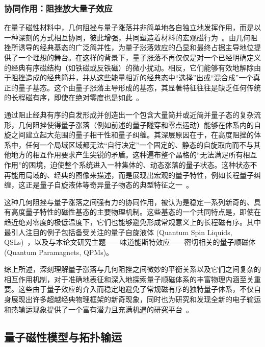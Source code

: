 \subsubsection{协同作用：阻挫放大量子效应}

在量子磁性材料中，几何阻挫与量子涨落并非简单地各自独立地发挥作用，而是以一种深刻的方式相互协同，彼此增强，共同塑造着材料的宏观磁行为~\cite{tu2022Evidence,bandyopadhyay2024Quantum}。由几何阻挫所诱导的经典基态的广泛简并性，为量子涨落效应的凸显和最终占据主导地位提供了一个理想的舞台。在这样的背景下，量子涨落不再仅仅是对一个已经明确定义的经典有序磁结构（如铁磁或反铁磁）的微小扰动。相反，它们能够有效地解除由于阻挫造成的经典简并，并从这些能量相近的经典态中“选择”出或“混合成”一个真正的量子基态。这个由量子涨落主导形成的基态，其显著特征往往是缺乏任何传统的长程磁有序，即使在绝对零度也是如此~\cite{chen2017Quantum}。

通过阻止经典有序的自发形成并创造出一个包含大量简并或近简并量子态的复杂流形，几何阻挫使得量子涨落（例如前述的量子隧穿和零点运动）能够在体系内的自旋之间建立起大范围的量子相干性和量子纠缠。其深层原因在于，在高度阻挫的体系中，任何一个局域区域都无法“自行决定”一个固定的、静态的自旋取向而不与其他地方的相互作用要求产生尖锐的矛盾。这种遍布整个晶格的“无法满足所有相互作用”的困境，迫使整个系统进入一种集体的、动态涨落的量子状态。这种状态不再能用局域的、经典的图像来描述，而是展现出宏观的量子特性，例如长程量子纠缠，这正是量子自旋液体等奇异量子物态的典型特征之一~\cite{matsuda2025Kitaev}。

这种几何阻挫与量子涨落之间强有力的协同作用，被认为是稳定一系列新奇的、具有高度量子特性的磁性基态的主要物理机制。这些基态的一个共同特点是，即使在趋近绝对零度的极低温度下，它们也能够避免形成常规意义上的长程磁有序。其中最引人注目的例子包括备受关注的量子自旋液体 (Quantum Spin Liquids, QSLs)~\cite{tu2022Evidence,chen2017Quantum}，以及与本论文研究主题——味道能斯特效应——密切相关的量子顺磁体 (Quantum Paramagnets, QPMs)。

综上所述，深刻理解量子涨落与几何阻挫之间微妙的平衡关系以及它们之间复杂的相互作用机制，对于准确地表征和深入地探索量子顺磁体系的丰富物理内涵至关重要。这些由于量子效应的介入而稳定地避免了常规磁有序的独特量子体系，不仅自身展现出许多超越经典物理框架的新奇现象，同时也为研究和发现全新的电子输运和热输运现象提供了一个富有潜力且充满机遇的研究平台~\cite{lu2024Spin,koyama2025Formulation}。

\subsection{量子磁性模型与拓扑输运}

